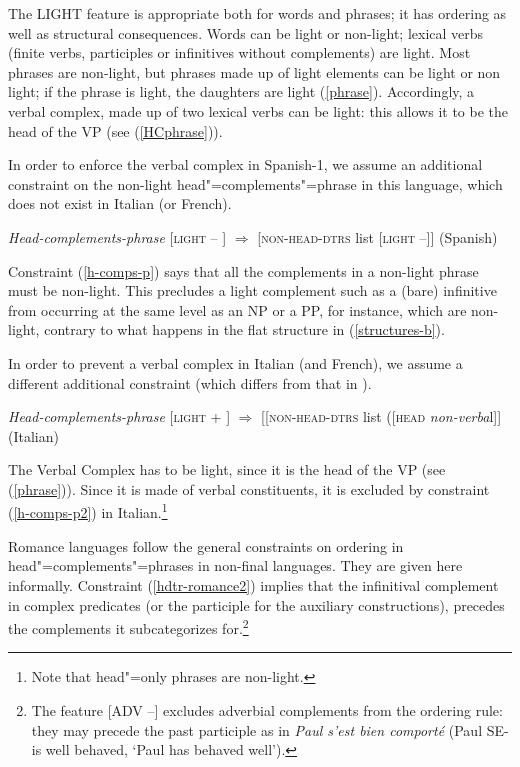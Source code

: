 \documentclass[output=paper]{langsci/langscibook}
\begin{document}
	
	The LIGHT feature is appropriate both for words and phrases; it has ordering as well as structural consequences. Words can be light or non-light; lexical verbs (finite verbs, participles or infinitives without complements) are light. Most phrases are non-light, but phrases made up of light elements can be light or non light; if the phrase is light, the daughters are light (\ref{phrase}). Accordingly, a verbal complex, made up of two lexical verbs can be light: this allows it to be the head of the VP (see (\ref{HCphrase})).
	
	In order to enforce the verbal complex in Spanish-1, we assume an additional constraint on the non-light head"=complements"=phrase in this language, which does not exist in Italian (or French).
	
	

	
	
	\begin{exe}
		\ex \label{h-comps-p}
		\textit{Head-complements-phrase} [\textsc{light} -- ] $\Rightarrow$ \textsc{[non-head-dtrs} list [\textsc{light} --]] (Spanish)
	\end{exe}


	Constraint (\ref{h-comps-p}) says that all the complements in a non-light phrase must be non-light. This precludes a light complement such as a (bare) infinitive from occurring at the same level as an NP or a PP, for instance, which are non-light, contrary to what happens in the flat structure in  (\ref{structures-b}). 
	
	In order to prevent a verbal complex in Italian (and French), we assume a different additional constraint (which differs from that in \cite{AG2005}).
	
	
	
	\begin{exe}
		\ex \label{h-comps-p2}
		\textit{Head-complements-phrase} [\textsc{light} + ] $\Rightarrow$ [\textsc{[non-head-dtrs} list ([\textsc{head} \textit{non-verba}l]] (Italian)
	\end{exe}
	
	

	
	The Verbal Complex has to be light, since it is the head of the VP (see (\ref{phrase})). Since it is made of verbal constituents, it is excluded by constraint (\ref{h-comps-p2}) in Italian.\footnote{Note that head"=only phrases are non-light.}
	
	Romance languages follow the general constraints on ordering in head"=complements"=phrases in non-final languages. They are given here informally. Constraint (\ref{hdtr-romance2}) implies that the infinitival complement in complex predicates (or the participle for the auxiliary constructions), precedes the complements it subcategorizes for.\footnote{The feature [ADV --] excludes adverbial complements from the ordering rule: they may precede the past participle as in \textit{Paul s’est bien comporté}  (Paul SE-is well behaved, ‘Paul has behaved well’).} 
	
\end{document}
